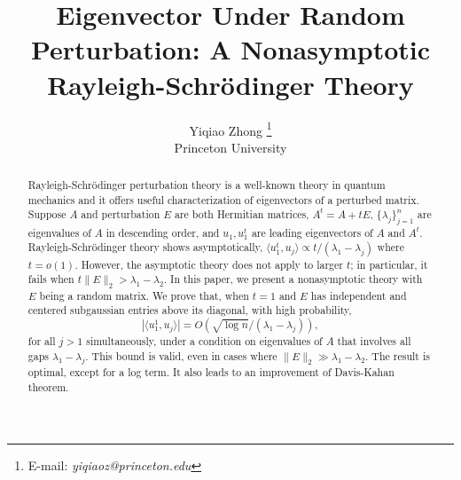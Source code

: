 \documentclass[12pt]{article}%
\theoremstyle{plain}%
\theoremstyle{remark}
\begin{document}
\newcommand{\argmin}{\mathrm{argmin}}
\newcommand{\argmax}{\mathrm{argmax}}
\newcommand{\diag}{\mathrm{diag}}
\newcommand{\ddiag}{\mathrm{ddiag}}
\newcommand{\rank}{\mathrm{rank}}
\newcommand{\Id}{\mathrm{Id}}
\newcommand{\Arg}{\mathrm{Arg}}
\newcommand{\bb}{\mathbb}
\newcommand{\SVD}{\mathrm{SVD}}
\newcommand{\etheta}{e^{i \theta}}
\newcommand{\mtheta}{\min_{\theta}}
\newcommand{\poly}{\mathrm{poly}}
\newcommand{\polylog}{\text{polylog } n}
\newcommand{\diam}{\mathrm{diam}}
\newcommand{\rad}{\mathrm{rad}}




\renewcommand{\Re}{\operatorname{Re}}
\renewcommand{\Im}{\operatorname{Im}}
\renewcommand{\hat}{\widehat}
\renewcommand{\cal}{\mathcal}
\renewcommand{\tilde}{\widetilde}



\makeatletter
\def\@biblabel#1{\hspace*{-\labelsep}}
\makeatother



\title{Eigenvector Under Random Perturbation: A Nonasymptotic Rayleigh-Schr\"{o}dinger Theory}
\author{Yiqiao Zhong \thanks{E-mail: \textit{yiqiaoz@princeton.edu}}\vspace{0.1in}\\
  Princeton University}

\date{}
\maketitle
\sloppy

\begin{abstract}
Rayleigh-Schr\"{o}dinger perturbation theory is a well-known theory in quantum mechanics and it offers useful characterization of eigenvectors of a perturbed matrix. Suppose $A$ and perturbation $E$ are both Hermitian matrices, $A^t = A + tE$, $\{\lambda_j\}_{j=1}^n$ are eigenvalues of $A$ in descending order, and $u_1, u^t_1$ are leading eigenvectors of $A$ and $A^t$. Rayleigh-Schr\"{o}dinger theory shows asymptotically, $\langle u^t_1, u_j \rangle \propto t / (\lambda_1 - \lambda_j)$ where $ t = o(1)$. However, the asymptotic theory does not apply to larger $t$; in particular, it fails when $ t \| E \|_2 > \lambda_1 - \lambda_2$. In this paper, we present a nonasymptotic theory with $E$ being a random matrix. We prove that, when $t = 1$ and $E$ has independent and centered subgaussian entries above its diagonal, with high probability, 
\begin{equation*}
| \langle u^1_1, u_j \rangle | = O(\sqrt{\log n} / (\lambda_1 - \lambda_j)),
\end{equation*}
for all $j>1$ simultaneously, under a condition on eigenvalues of $A$ that involves all gaps $\lambda_1 - \lambda_j$. This bound is valid, even in cases where $\| E \|_2 \gg \lambda_1 - \lambda_2$. The result is optimal, except for a log term. It also leads to an improvement of Davis-Kahan theorem.
\end{abstract}
\end{document}
